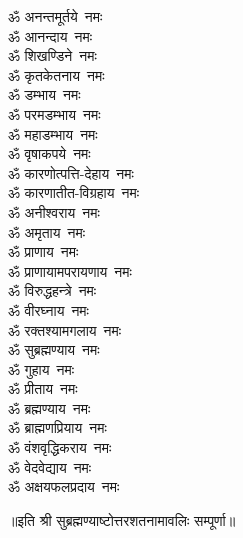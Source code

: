 \begin{multicols}{2}
\begin{flushleft}
ॐ अनन्तमूर्तये~नमः\\
ॐ आनन्दाय~नमः\\
ॐ शिखण्डिने~नमः\\
ॐ कृतकेतनाय~नमः\\
ॐ डम्भाय~नमः\\
ॐ परमडम्भाय~नमः\\
ॐ महाडम्भाय~नमः\hfill{}\\
ॐ वृषाकपये~नमः\\
ॐ कारणोत्पत्ति-देहाय~नमः\\
ॐ कारणातीत-विग्रहाय~नमः\\
ॐ अनीश्वराय~नमः\\
ॐ अमृताय~नमः\\
ॐ प्राणाय~नमः\\
ॐ प्राणायामपरायणाय~नमः\\
ॐ विरुद्धहन्त्रे~नमः\\
ॐ वीरघ्नाय~नमः\\
ॐ रक्तश्यामगलाय~नमः\hfill{}\\
ॐ सुब्रह्मण्याय~नमः\\
ॐ गुहाय~नमः\\
ॐ प्रीताय~नमः\\
ॐ ब्रह्मण्याय~नमः\\
ॐ ब्राह्मणप्रियाय~नमः\\
ॐ वंशवृद्धिकराय~नमः\\
ॐ वेदवेद्याय~नमः\\
ॐ अक्षयफलप्रदाय~नमः\\
\end{flushleft}
\end{multicols}

॥इति श्री सुब्रह्मण्याष्टोत्तरशतनामावलिः सम्पूर्णा॥


